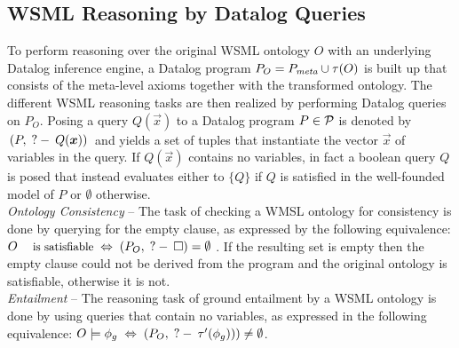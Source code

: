 \subsection{WSML Reasoning by Datalog Queries}

To perform reasoning over the original WSML ontology $O$ with an
underlying Datalog inference engine, a Datalog program $P_O =
\mlaxioms \cup \tau(O) $
is built up that consists of the meta-level axioms together with the
transformed ontology. The different WSML reasoning tasks are then
realized by performing Datalog queries on $P_O$. Posing a query
$Q(\vec{x})$ to a Datalog program $P \in \P$ is denoted by
$\,(P,\qury Q(\vec{x}))\,$ and yields a set of tuples that
instantiate the vector $\vec{x}$ of variables in the query. If
$Q(\vec{x})$ contains no variables, in fact a boolean query $Q$ is
posed that instead evaluates either to $\{Q\}$ if $Q$ is satisfied
in the well-founded model of $P$ or $\emptyset$
otherwise.\\[2mm]
%
{\it Ontology Consistency} -- The task of checking a WMSL ontology
for consistency is done by querying for the empty clause, as
expressed by the following equivalence: $ O \;
\textrm{\footnotesize{is satisfiable}} \; \Leftrightarrow \; (P_O ,
\qury \square) =
    \emptyset $
. If the resulting set is empty then the empty clause could not be
derived from the program and the original ontology is satisfiable,
otherwise it is not.\\[2mm]
%
{\it Entailment} -- The reasoning task of ground entailment by a
WSML ontology is done by using queries that contain no variables, as
expressed in the following equivalence: $O \models \phi_g \;
\Leftrightarrow \; (P_O, \qury \tau'(\phi_g)) ) \not= \emptyset$.
